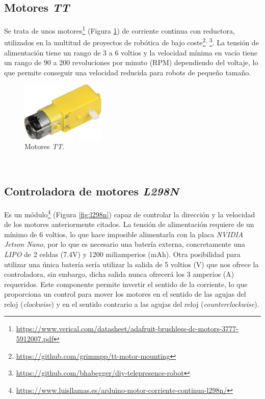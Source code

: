 \subsection{Motores \textit{TT}}
\label{subsection:motortt}
Se trata de unos motores\footnote{\url{https://www.verical.com/datasheet/adafruit-brushless-dc-motors-3777-5912007.pdf}} (Figura \ref{fig:motorTT}) de corriente continua con reductora, utilizados en la multitud de proyectos de robótica de bajo coste\footnote{\url{https://github.com/grimmpp/tt-motor-mounting}}$^{,\thinspace}$\footnote{\url{https://github.com/bhabegger/diy-telepresence-robot}}. La tensión de alimentación tiene un rango de 3 a 6 voltios y la velocidad mínima en vacío tiene un rango de 90 a 200 revoluciones por minuto (RPM) dependiendo del voltaje, lo que permite conseguir una velocidad reducida para robots de pequeño tamaño.\\

\begin{figure} [h!]
	\begin{center}
		\includegraphics[width=4cm]{figs/motorTT}
	\end{center}
	\caption{Motores \textit{TT}.}
	\label{fig:motorTT}
\end{figure}\

\subsection{Controladora de motores \textit{L298N}}
\label{subsection:l298n}
Es un módulo\footnote{\url{https://www.luisllamas.es/arduino-motor-corriente-continua-l298n/}} (Figura \ref{fig:l298n}) capaz de controlar la dirección y la velocidad de los motores anteriormente citados. La tensión de alimentación requiere de un mínimo de 6 voltios, lo que hace imposible alimentarla con la placa \textit{NVIDIA Jetson Nano}, por lo que es necesario una batería externa, concretamente una \textit{LIPO} de 2 celdas (7.4V) y 1200 miliamperios (mAh). Otra posibilidad para utilizar una única batería sería utilizar la salida de 5 voltios (V) que nos ofrece la controladora, sin embargo, dicha salida nunca ofrecerá los 3 amperios (A) requeridos. Este componente permite invertir el sentido de la corriente, lo que proporciona un control para mover los motores en el sentido de las agujas del reloj (\textit{clockwise}) y en el sentido contrario a las agujas del reloj (\textit{counterclockwise}).\\

